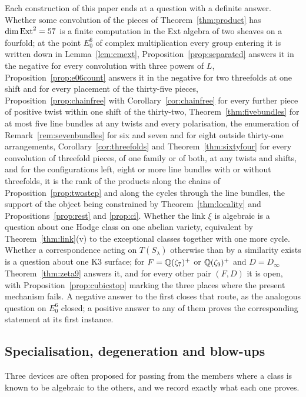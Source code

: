 Each construction of this paper ends at a question with a definite answer. Whether some convolution of the pieces of Theorem~\ref{thm:product} has $\dim\mathrm{Ext}^{2}=57$ is a finite computation in the Ext algebra of two sheaves on a fourfold; at the point $E_{0}^{6}$ of complex multiplication every group entering it is written down in Lemma~\ref{lem:cmext}, Proposition~\ref{prop:separated} answers it in the negative for every convolution with three powers of $L$, Proposition~\ref{prop:e06count} answers it in the negative for two threefolds at one shift and for every placement of the thirty-five pieces, Proposition~\ref{prop:chainfree} with Corollary~\ref{cor:chainfree} for every further piece of positive twist within one shift of the thirty-two, Theorem~\ref{thm:fivebundles} for at most five line bundles at any twists and every polarisation, the enumeration of Remark~\ref{rem:sevenbundles} for six and seven and for eight outside thirty-one arrangements, Corollary~\ref{cor:threefolds} and Theorem~\ref{thm:sixtyfour} for every convolution of threefold pieces, of one family or of both, at any twists and shifts, and for the configurations left, eight or more line bundles with or without threefolds, it is the rank of the products along the chains of Proposition~\ref{prop:twostep} and along the cycles through the line bundles, the support of the object being constrained by Theorem~\ref{thm:locality} and Propositions~\ref{prop:rest} and \ref{prop:ci}. Whether the link $\xi$ is algebraic is a question about one Hodge class on one abelian variety, equivalent by Theorem~\ref{thm:link}(v) to the exceptional classes together with one more cycle. Whether a correspondence acting on $T(S_{\lambda})$ otherwise than by a similarity exists is a question about one K3 surface; for $F=\mathbb{Q}(\zeta_{7})^{+}$ or $\mathbb{Q}(\zeta_{9})^{+}$ and $D=D_{\infty}$ Theorem~\ref{thm:zeta9} answers it, and for every other pair $(F,D)$ it is open, with Proposition~\ref{prop:cubicstop} marking the three places where the present mechanism fails. A negative answer to the first closes that route, as the analogous question on $E_{0}^{6}$ closed; a positive answer to any of them proves the corresponding statement at its first instance.

\subsection{Specialisation, degeneration and blow-ups}\label{ssec:bypass}

Three devices are often proposed for passing from the members where a class is known to be algebraic to the others, and we record exactly what each one proves.


